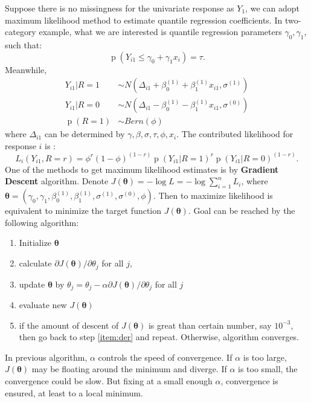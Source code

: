 \documentclass[12pt]{article}
\DeclareMathOperator{\pr}{p}
\begin{document}
Suppose there is no missingness for the univariate response as $Y_1$,
we can adopt maximum likelihood method to estimate quantile regression
coefficients. In two-category example, what we are interested is
quantile regression parameters $\gamma_0, \gamma_{1}$, such that:
\begin{displaymath}
  \pr (Y_{i1} \leq \gamma_0 + \gamma_1x_i) = \tau.
\end{displaymath}
Meanwhile,
\begin{align*}
  Y_{i1} | R = 1 & \sim N(\Delta_{i1} + \beta_0^{(1)} + \beta_1^{(1)}x_{i1}, \sigma^{(1)}) \\
  Y_{i1} | R = 0 & \sim N(\Delta_{i1} - \beta_0^{(1)} - \beta_1^{(1)}x_{i1}, \sigma^{(0)}) \\
  \pr (R = 1) & \sim Bern(\phi)
\end{align*}
where $\Delta_{i1}$ can be determined by $\gamma, \beta, \sigma, \tau,
\phi, x_i$. The contributed likelihood for response $i$ is :
\begin{equation}
  \label{eq:emp}
  L_i(Y_{i1}, R = r) = \phi^r(1-\phi)^{(1-r)}\pr \left( Y_{i1}|R = 1 \right)^r \pr \left( Y_{i1}|R = 0 \right)^{(1-r)}.
\end{equation}
One of the methods to get maximum likelihood estimates is by
\textbf{Gradient Descent} algorithm. Denote $J(\bm \theta) = - \log L
= - \log \sum_{i = 1}^n L_i$, where $\bm \theta = (\gamma_0, \gamma_1,
\beta_0^{(1)}, \beta_1^{(1)}, \sigma^{(1)}, \sigma^{(0)}, \phi)$.
Then to maximize likelihood is equivalent to minimize the target
function $J(\bm \theta)$. Goal can be reached by the following algorithm:
\begin{enumerate}
\item Initialize $\bm \theta$
\item \label{item:der} calculate $\partial J(\bm \theta) / \partial \theta_j$ for all $j$,
\item update $\bm \theta$ by $\theta_j = \theta_j - \alpha \partial J(\bm \theta) / \partial \theta_j$ for all $j$
\item evaluate new $J(\bm \theta)$
\item if the amount of descent of $J ( \bm \theta)$ is great than certain
  number, say $10^{-3}$, then go back to step \ref{item:der} and
  repeat. Otherwise, algorithm converges.
\end{enumerate}
In previous algorithm, $\alpha$ controls the speed of convergence. If $\alpha$
is too large, $J(\bm \theta)$ may be floating around the minimum and
diverge. If $\alpha$ is too small, the convergence could be slow. But
fixing at a small enough $\alpha$, convergence is ensured, at least to
a local minimum.
\end{document}
